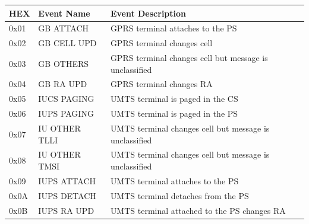 {\small
	\begin{longtable}{|l|p{4cm}|p{8cm}|}
		\hline
		\textbf{HEX} & \textbf{ Event Name}                 & \textbf{Event Description}                                                                                 \\ \hline
		0x01         & GB ATTACH                            & GPRS terminal attaches to the PS                                                                           \\ \hline
		0x02         & GB CELL UPD                          & GPRS terminal changes cell                                                                                 \\ \hline
		0x03         & GB OTHERS                            & GPRS terminal changes cell but message is unclassified                                                     \\ \hline
		0x04         & GB RA UPD                            & GPRS terminal changes RA                                                                                   \\ \hline
		0x05         & IUCS PAGING                          & UMTS terminal is paged in the CS                                                                           \\ \hline
		0x06         & IUPS PAGING                          & UMTS terminal is paged in the PS                                                                           \\ \hline
		0x07         & IU OTHER TLLI                        & UMTS terminal changes cell but message is unclassified                                                     \\ \hline
		0x08         & IU OTHER TMSI                        & UMTS terminal changes cell but message is unclassified                                                     \\ \hline
		0x09         & IUPS ATTACH                          & UMTS terminal attaches to the PS                                                                           \\ \hline
		0x0A         & IUPS DETACH                          & UMTS terminal detaches from the PS                                                                         \\ \hline
		0x0B         & IUPS RA UPD                          & UMTS terminal attached to the PS changes RA                                                                \\ \hline

\end{longtable}}

